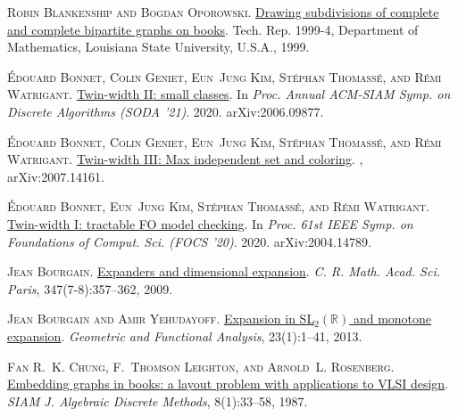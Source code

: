 \documentclass[kpfonts]{patmorin}
\begin{document}
\begin{thebibliography}{44}
	\textsc{Robin Blankenship and Bogdan Oporowski}.
	\newblock \href{http://www.math.lsu.edu/~preprint/1999/rbbo991.ps}{Drawing
		subdivisions of complete and complete bipartite graphs on books}.
	\newblock Tech. Rep. 1999-4, Department of Mathematics, Louisiana State
	University, U.S.A., 1999.

	\textsc{\'Edouard Bonnet, Colin Geniet, Eun~Jung Kim, St\'ephan Thomass\'e, and
		R\'emi Watrigant}.
	\newblock \href{http://arxiv.org/abs/2006.09877}{Twin-width {II}: small
		classes}.
	\newblock In \emph{Proc. Annual ACM-SIAM Symp. on Discrete Algorithms (SODA
		'21)}. 2020{}.
	\newblock arXiv:2006.09877.

	\textsc{\'Edouard Bonnet, Colin Geniet, Eun~Jung Kim, St\'ephan Thomass\'e, and
		R\'emi Watrigant}.
	\newblock \href{http://arxiv.org/abs/2007.14161}{Twin-width {III}: Max
		independent set and coloring}.
	, arXiv:2007.14161.

	\textsc{\'Edouard Bonnet, Eun~Jung Kim, St\'ephan Thomass\'e, and R\'emi
		Watrigant}.
	\newblock \href{http://arxiv.org/abs/2004.14789}{Twin-width {I}: tractable {FO}
		model checking}.
	\newblock In \emph{Proc. 61st IEEE Symp. on Foundations of Comput. Sci. (FOCS
		'20)}. 2020{}.
	\newblock arXiv:2004.14789.

	\textsc{Jean Bourgain}.
	\newblock \href{https://doi.org/10.1016/j.crma.2009.02.009}{Expanders and
		dimensional expansion}.
	\newblock \emph{C. R. Math. Acad. Sci. Paris}, 347(7-8):357--362, 2009.

	\textsc{Jean Bourgain and Amir Yehudayoff}.
	\newblock \href{https://doi.org/10.1007/s00039-012-0200-9}{Expansion in
		{SL$_2(\mathbb{R})$} and monotone expansion}.
	\newblock \emph{Geometric and Functional Analysis}, 23(1):1--41, 2013.

	\textsc{Fan R.~K. Chung, F.~Thomson Leighton, and Arnold~L. Rosenberg}.
	\newblock \href{https://doi.org/10.1137/0608002}{Embedding graphs in books: a
		layout problem with applications to {V}{L}{S}{I} design}.
	\newblock \emph{SIAM J. Algebraic Discrete Methods}, 8(1):33--58, 1987.


\end{thebibliography}
\end{document}
